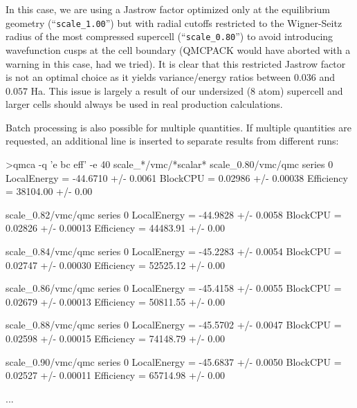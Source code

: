 In this case, we are using a Jastrow factor optimized only at the 
equilibrium geometry (``\texttt{scale\_1.00}'') but with radial 
cutoffs restricted to the Wigner-Seitz radius of the most compressed 
supercell (``\texttt{scale\_0.80}'') to avoid introducing wavefunction 
cusps at the cell boundary (QMCPACK would have aborted with a warning in 
this case, had we tried).  It is clear that this restricted Jastrow factor 
is not an optimal choice as it yields variance/energy ratios between $0.036$ 
and $0.057$ Ha.  This issue is largely a result of our undersized (8 atom) 
supercell and larger cells should always be used in real production 
calculations.

Batch processing is also possible for multiple quantities.  If multiple 
quantities are requested, an additional line is inserted to separate 
results from different runs:
\begin{shade}
>qmca -q 'e bc eff' -e 40 scale_*/vmc/*scalar*
scale_0.80/vmc/qmc  series 0 
  LocalEnergy           =          -44.6710 +/-           0.0061 
  BlockCPU              =           0.02986 +/-          0.00038 
  Efficiency            =          38104.00 +/-             0.00 

scale_0.82/vmc/qmc  series 0 
  LocalEnergy           =          -44.9828 +/-           0.0058 
  BlockCPU              =           0.02826 +/-          0.00013 
  Efficiency            =          44483.91 +/-             0.00 

scale_0.84/vmc/qmc  series 0 
  LocalEnergy           =          -45.2283 +/-           0.0054 
  BlockCPU              =           0.02747 +/-          0.00030 
  Efficiency            =          52525.12 +/-             0.00 

scale_0.86/vmc/qmc  series 0 
  LocalEnergy           =          -45.4158 +/-           0.0055 
  BlockCPU              =           0.02679 +/-          0.00013 
  Efficiency            =          50811.55 +/-             0.00 

scale_0.88/vmc/qmc  series 0 
  LocalEnergy           =          -45.5702 +/-           0.0047 
  BlockCPU              =           0.02598 +/-          0.00015 
  Efficiency            =          74148.79 +/-             0.00 

scale_0.90/vmc/qmc  series 0 
  LocalEnergy           =          -45.6837 +/-           0.0050 
  BlockCPU              =           0.02527 +/-          0.00011 
  Efficiency            =          65714.98 +/-             0.00 

...
\end{shade}



